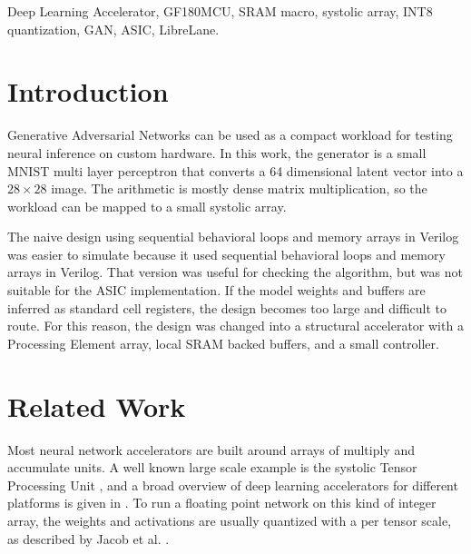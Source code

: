 \documentclass[conference]{IEEEtran}
\begin{document}
\begin{abstract}
This paper presents 8 Bit Deep Learning Accelerator for a small GAN image generator on the open GF180MCU 180 nm process. The target network is a three layer multi layer perceptron generator trained on MNIST. The software model is quantized from FP32 to signed 8 bit integers and mapped to a structural $4\times4$ Processing Element array. Each element performs signed multiplication and 24 bit accumulation for tiled matrix multiplication. The A, B, and C operand buffers use eleven physical $256\times8$ SRAM macros instead of inferred register arrays. Verification is done against Python vectors for one matrix multiplication, one layer row, and a full 784 pixel image. The design is implemented with LibreLane on GF180MCU and produces a routed GDS layout with zero Magic DRC errors, zero Netgen LVS errors, and zero antenna violations. The final layout uses a $1.6\times1.5$ mm$^2$ die and meets a 75 ns clock across the evaluated STA corners.
\end{abstract}

\begin{IEEEkeywords}
Deep Learning Accelerator, GF180MCU, SRAM macro, systolic array, INT8 quantization, GAN, ASIC, LibreLane.
\end{IEEEkeywords}

\section{Introduction}
Generative Adversarial Networks can be used as a compact workload for testing neural inference on custom hardware. In this work, the generator is a small MNIST multi layer perceptron that converts a 64 dimensional latent vector into a $28\times28$ image. The arithmetic is mostly dense matrix multiplication, so the workload can be mapped to a small systolic array.

The naive design using sequential behavioral loops and memory arrays in Verilog was easier to simulate because it used sequential behavioral loops and memory arrays in Verilog. That version was useful for checking the algorithm, but was not suitable for the ASIC implementation. If the model weights and buffers are inferred as standard cell registers, the design becomes too large and difficult to route. For this reason, the design was changed into a structural accelerator with a Processing Element array, local SRAM backed buffers, and a small controller.

\section{Related Work}
Most neural network accelerators are built around arrays of multiply and accumulate units. A well known large scale example is the systolic Tensor Processing Unit \cite{tpu}, and a broad overview of deep learning accelerators for different platforms is given in \cite{survey}. To run a floating point network on this kind of integer array, the weights and activations are usually quantized with a per tensor scale, as described by Jacob et al. \cite{jacob}.
\end{document}
